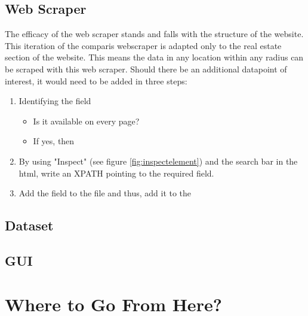 \documentclass[main]{subfiles}
\begin{document}
\subsection{Web Scraper}
The efficacy of the web scraper stands and falls with the structure of the website.
This iteration of the comparis webscraper is adapted only to the real estate section of the website.
This means the data in any location within any radius can be scraped with this web scraper.
Should there be an additional datapoint of interest,
it would need to be added in three steps:
\begin{enumerate}
    \item Identifying the field
    \begin{itemize}
        \item Is it available on every page?
        \item If yes, then 
    \end{itemize}
    \item By using "Inspect" (see figure \ref{fig:inspectelement}) and the search bar in the \ac*{html}, write an XPATH pointing to the required field.
    \item Add the field to the \pkg[items.py] file and thus, add it to the \pkg[ItemLoader]
\end{enumerate}



\subsection{Dataset}

\subsection{GUI}

\section{Where to Go From Here?}
\end{document}
